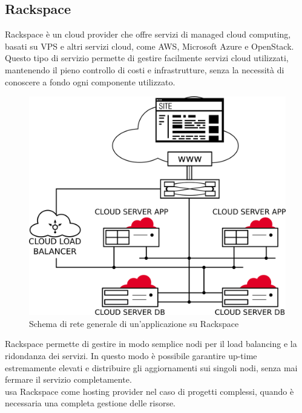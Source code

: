    \subsection{Rackspace}
   Rackspace è un cloud provider che offre servizi di managed cloud computing, basati su \gls{VPS} e altri servizi cloud, come \gls{AWS}, Microsoft Azure e OpenStack. Questo tipo di servizio permette di gestire facilmente servizi cloud utilizzati, mantenendo il pieno controllo di costi e infrastrutture, senza la necessità di conoscere a fondo ogni componente utilizzato.
   \begin{figure}[H]
      \begin{center}
      \includegraphics[width=14cm,keepaspectratio]{immagini/rackspace-network}
      \end{center}
      \caption{Schema di rete generale di un'applicazione su Rackspace}
   \end{figure}
   Rackspace permette di gestire in modo semplice nodi per il load balancing e la ridondanza dei servizi. In questo modo è possibile garantire up-time estremamente elevati e distribuire gli aggiornamenti sui singoli nodi, senza mai fermare il servizio completamente.
   \\
   \nomeAzienda{} usa Rackspace come hosting provider nel caso di progetti complessi, quando è necessaria una completa gestione delle risorse.

